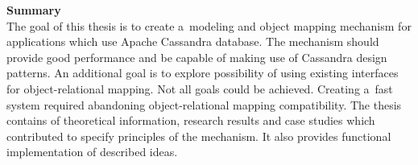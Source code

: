  \textbf{Summary} \\
 
  The goal of this thesis is to create a~modeling and object mapping mechanism for applications which use Apache Cassandra database. The mechanism should provide good performance and be capable of making use of Cassandra design patterns. An additional goal is to explore possibility of using existing interfaces for object-relational mapping. Not all goals could be achieved. Creating a~fast system required abandoning object-relational mapping compatibility. The thesis contains of theoretical information, research results and case studies which contributed to specify principles of the mechanism. It also provides functional implementation of described ideas.
 

